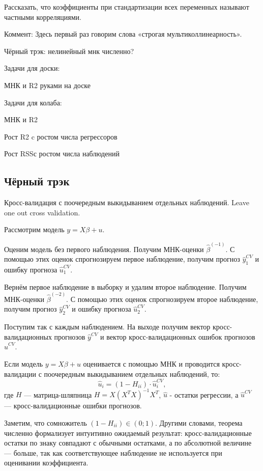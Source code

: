 \documentclass[12pt]{article}
\newcommand{\RSS}{RSS}
\begin{document}
Рассказать, что коэффициенты при стандартизации всех переменных называют частными корреляциями. 

Коммент: Здесь первый раз говорим слова «строгая мультиколлинеарность».

Чёрный трэк: нелинейный мнк численно?

Задачи для доски:

МНК и R2 руками на доске

Задачи для колаба:

МНК и R2

Рост R2 c ростом числа регрессоров

Рост \RSS с ростом числа наблюдений


\subsection{Чёрный трэк}

\begin{definition}
Кросс-валидация с поочередным выкидыванием отдельных наблюдений. 
Leave one out cross validation.

Рассмотрим модель $y=X\beta + u$. 

Оценим модель без первого наблюдения. Получим МНК-оценки $\hat\beta^{(-1)}$.
С помощью этих оценок спрогнозируем первое наблюдение, получим прогноз $\hat y_1^{CV}$ и ошибку прогноза $\hat u_1^{CV}$.

Вернём первое наблюдение в выборку и удалим второе наблюдение. Получим МНК-оценки $\hat\beta^{(-2)}$.
С помощью этих оценок спрогнозируем второе наблюдение, получим прогноз $\hat y_2^{CV}$ и ошибку прогноза $\hat u_2^{CV}$.

Поступим так с каждым наблюдением. На выходе получим вектор кросс-валидационных прогнозов $\hat y^{CV}$ и вектор кросс-валидационных ошибок прогнозов $\hat u^{CV}$.    
\end{definition}

\begin{theorem}
Если модель $y=X\beta + u$ оценивается с помощью МНК и проводится кросс-валидации с поочередным выкидыванием отдельных наблюдений, то:
\[
\hat u_i = (1 - H_{ii}) \cdot \hat u_i^{CV},
\]
где $H$ — матрица-шляпница $H = X(X^TX)^{-1}X^T$, $\hat u$ - остатки регрессии, а $\hat u^{CV}$ — кросс-валидационные ошибки прогнозов.
\end{theorem}

Заметим, что сомножитель $(1 - H_{ii}) \in (0;1)$. 
Другими словами, теорема численно формализует интуитивно ожидаемый результат: кросс-валидационные остатки по знаку совпадают с обычными остатками, а по абсолютной величине — больше, так как соответствующее наблюдение не используется при оценивании коэффициента. 
\end{document}
